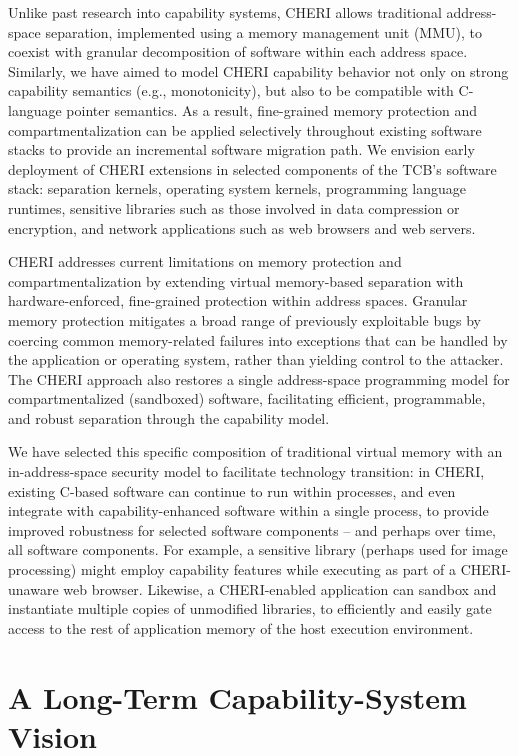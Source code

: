 Unlike past research into capability systems, CHERI allows traditional address-space separation, implemented using a memory management unit (MMU), to
coexist with granular decomposition of software within each address space.
Similarly, we have aimed to model CHERI capability behavior not only on strong
capability semantics (e.g., monotonicity), but also to be compatible with
C-language pointer semantics.
As a result, fine-grained memory protection and compartmentalization can be applied selectively throughout existing software
stacks to provide an incremental software migration path.
We envision early deployment of CHERI extensions in selected components of the
TCB's software stack: separation kernels, operating system kernels, programming
language runtimes, sensitive libraries such as those involved in data compression or encryption, and network applications such as web browsers and web
servers.

CHERI addresses current limitations on memory protection and compartmentalization by extending virtual
memory-based separation with hardware-enforced, fine-grained protection within address spaces.
Granular memory protection mitigates a broad range of previously exploitable bugs by coercing common memory-related failures into exceptions that can be handled by the application or operating system, rather than yielding control to the attacker.
The CHERI approach also restores a single address-space programming model for
compartmentalized (sandboxed) software, facilitating efficient, programmable, and robust
separation through the capability model.

We have selected this specific composition of traditional virtual memory with an
in-address-space security model to facilitate technology transition: in CHERI,
existing C-based software can continue to run within processes, and even
integrate with capability-enhanced software within a single process, to provide
improved robustness for selected software components -- and perhaps over time, all
software components.
For example, a sensitive library (perhaps used for image processing) might employ
capability features while executing as part of a CHERI-unaware web browser.
Likewise, a CHERI-enabled application can sandbox and instantiate multiple copies of
unmodified libraries, to efficiently and easily gate access to the rest of application
memory of the host execution environment.

\section{A Long-Term Capability-System Vision}

